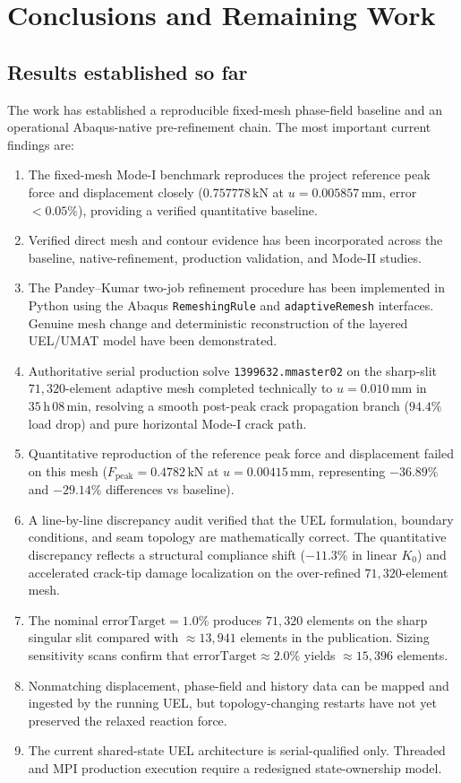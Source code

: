 \chapter{Conclusions and Remaining Work}
\label{ch:conclusions}

\section{Results established so far}
The work has established a reproducible fixed-mesh phase-field baseline and an operational Abaqus-native pre-refinement chain. The most important current findings are:
\begin{enumerate}
  \item The fixed-mesh Mode-I benchmark reproduces the project reference peak force and displacement closely ($0.757778\,\mathrm{kN}$ at $u=0.005857\,\mathrm{mm}$, error $<0.05\%$), providing a verified quantitative baseline.
  \item Verified direct mesh and contour evidence has been incorporated across the baseline, native-refinement, production validation, and Mode-II studies.
  \item The Pandey--Kumar two-job refinement procedure has been implemented in Python using the Abaqus \texttt{RemeshingRule} and \texttt{adaptiveRemesh} interfaces. Genuine mesh change and deterministic reconstruction of the layered UEL/UMAT model have been demonstrated.
  \item Authoritative serial production solve \texttt{1399632.mmaster02} on the sharp-slit $71{,}320$-element adaptive mesh completed technically to $u=0.010\,\mathrm{mm}$ in $35\,\mathrm{h}\,08\,\mathrm{min}$, resolving a smooth post-peak crack propagation branch ($94.4\%$ load drop) and pure horizontal Mode-I crack path.
  \item Quantitative reproduction of the reference peak force and displacement failed on this mesh ($F_{\text{peak}} = 0.4782\,\mathrm{kN}$ at $u=0.00415\,\mathrm{mm}$, representing $-36.89\%$ and $-29.14\%$ differences vs baseline).
  \item A line-by-line discrepancy audit verified that the UEL formulation, boundary conditions, and seam topology are mathematically correct. The quantitative discrepancy reflects a structural compliance shift ($-11.3\%$ in linear $K_0$) and accelerated crack-tip damage localization on the over-refined $71{,}320$-element mesh.
  \item The nominal $\text{errorTarget}=1.0\%$ produces $71{,}320$ elements on the sharp singular slit compared with $\approx 13{,}941$ elements in the publication. Sizing sensitivity scans confirm that $\text{errorTarget} \approx 2.0\%$ yields $\approx 15{,}396$ elements.
  \item Nonmatching displacement, phase-field and history data can be mapped and ingested by the running UEL, but topology-changing restarts have not yet preserved the relaxed reaction force.
  \item The current shared-state UEL architecture is serial-qualified only. Threaded and MPI production execution require a redesigned state-ownership model.
\end{enumerate}

